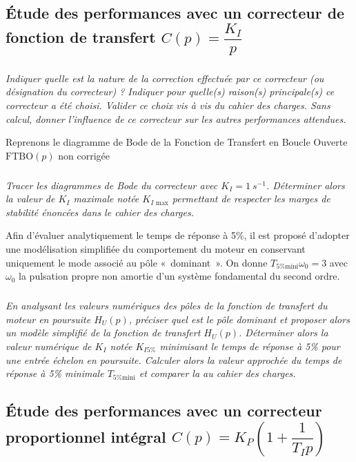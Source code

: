 \begin{multicols}{2}
\subsection*{Étude des performances avec un correcteur de fonction de transfert $C(p)=\dfrac{K_I}{p}$}

\subparagraph{}\textit{Indiquer quelle est la nature de la correction effectuée par ce correcteur (ou désignation du correcteur) ? Indiquer pour quelle(s) raison(s) principale(s) ce correcteur a été choisi. Valider ce choix vis à vis du cahier
des charges. Sans calcul, donner l’influence de ce correcteur sur les autres performances attendues.}
\ifprof
\begin{corrige}
\end{corrige}
\else
\fi

Reprenons le diagramme de Bode de la Fonction de Transfert en Boucle Ouverte $\text{FTBO}( p)$ non corrigée

\subparagraph{}\textit{Tracer les diagrammes de Bode du correcteur avec $K_I = \SI{1}{s^{-1}}$. Déterminer alors la valeur de $K_I$ maximale notée $K_{I\text{ max}}$ permettant de respecter les marges de stabilité énoncées dans le cahier des charges.}
\ifprof
\begin{corrige}
\end{corrige}
\else
\fi

Afin d’évaluer analytiquement le temps de réponse à 5\%, il est proposé d’adopter une modélisation simplifiée du
comportement du moteur en conservant uniquement le mode associé au pôle «~dominant~». On donne $T_{5\% \text{mini}} \omega_0 = 3$ avec $\omega_0$ la pulsation propre non amortie d’un système fondamental du second ordre.


\subparagraph{}\textit{En analysant les valeurs numériques des pôles de la fonction de transfert du moteur en poursuite $H_U(p)$,
préciser quel est le pôle dominant et proposer alors un modèle simplifié de la fonction de transfert $H_U(p)$.
Déterminer alors la valeur numérique de $K_I$ notée $K_{I 5\%}$ minimisant le temps de réponse à 5\% pour une
entrée échelon en poursuite. Calculer alors la valeur approchée du temps de réponse à 5\% minimale $T_{5\% \text{mini}}$
et comparer la au cahier des charges.}
\ifprof
\begin{corrige}
\end{corrige}
\else
\fi

\subsection*{Étude des performances avec un correcteur proportionnel intégral $C(p)=K_P\left(1+\dfrac{1}{T_I p} \right)$}


\end{multicols}
